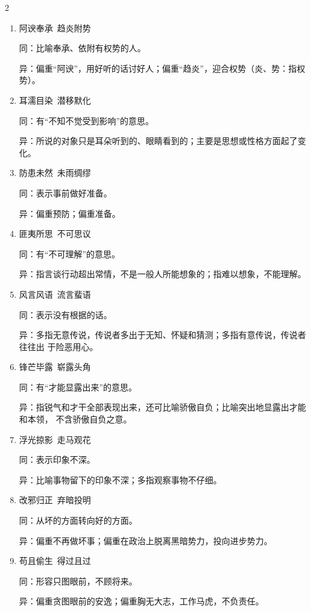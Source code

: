 \documentclass[final,oneside]{ctexbook}
\begin{document}
\begin{multicols}{2}
\begin{enumerate}
    \item 阿谀奉承~趋炎附势

      同：比喻奉承、依附有权势的人。

      异：偏重“阿谀”，用好听的话讨好人；偏重“趋炎”，迎合权势（炎、势：指权势）。

    \item 耳濡目染~潜移默化

      同：有“不知不觉受到影响”的意思。

      异：所说的对象只是耳朵听到的、眼睛看到的；主要是思想或性格方面起了变化。

    \item 防患未然~未雨绸缪

      同：表示事前做好准备。

      异：偏重预防；偏重准备。

    \item 匪夷所思~不可思议

      同：有“不可理解”的意思。

      异：指言谈行动超出常情，不是一般人所能想象的；指难以想象，不能理解。

    \item 风言风语~流言蜚语

      同：表示没有根据的话。

      异：多指无意传说，传说者多出于无知、怀疑和猜测；多指有意传说，传说者往往出
      于险恶用心。

    \item 锋芒毕露~崭露头角

      同：有“才能显露出来”的意思。

      异：指锐气和才干全部表现出来，还可比喻骄傲自负；比喻突出地显露出才能和本领，
      不含骄傲自负之意。

    \item 浮光掠影~走马观花

      同：表示印象不深。

      异：比喻事物留下的印象不深；多指观察事物不仔细。

    \item 改邪归正~弃暗投明

      同：从坏的方面转向好的方面。

      异：偏重不再做坏事；偏重在政治上脱离黑暗势力，投向进步势力。

    \item 苟且偷生~得过且过

      同：形容只图眼前，不顾将来。

      异：偏重贪图眼前的安逸；偏重胸无大志，工作马虎，不负责任。


\end{enumerate}
\end{multicols}
\end{document}
